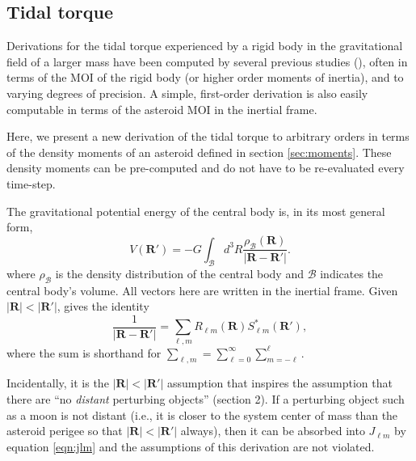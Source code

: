 \documentclass[9pt,twocolumn]{article}
\numberwithin{equation}{section}
\begin{document}
\subsection{Tidal torque}
\label{sec:tidal-torque}

Derivations for the tidal torque experienced by a rigid body in the gravitational field of a larger mass have been computed by several previous studies (\cite{paul88,HouMar2017,BOUE2009750, ashenberg07}), often in terms of the MOI of the rigid body (or higher order moments of inertia), and to varying degrees of precision. A simple, first-order derivation is also easily computable in terms of the asteroid MOI in the inertial frame.

Here, we present a new derivation of the tidal torque to arbitrary orders in terms of the density moments of an asteroid defined in section \ref{sec:moments}. These density moments can be pre-computed and do not have to be re-evaluated every time-step.

The gravitational potential energy of the central body is, in its most general form,
\begin{equation}
V(\bm R') = -G\int_\mathcal{B} d^3 R \frac{\rho_\mathcal{B}(\bm R)}{|\bm{R}-\bm{R'}|}.
\label{eqn:first-pe}
\end{equation}
where $\rho_\mathcal{B}$ is the density distribution of the central body and $\mathcal{B}$ indicates the central body's volume. All vectors here are written in the inertial frame. Given $|\bm{R}| < |\bm{R'}|$, \cite{Gelderen1998TheSO} gives the identity
\begin{equation}
  \frac{1}{|\bm R - \bm R'|} = \sum_{\ell, m} R_{\ell m}(\bm R) S_{\ell m}^*(\bm R'),
  \label{eqn:ylm-expansion}
\end{equation}
where the sum is shorthand for $\sum_{\ell, m} = \sum_{\ell = 0}^\infty \sum_{m=-\ell}^\ell$.

Incidentally, it is the $|\bm R| < |\bm R'|$ assumption that inspires the assumption that there are ``no \textit{distant} perturbing objects'' (section 2). If a perturbing object such as a moon is not distant (i.e., it is closer to the system center of mass than the asteroid perigee so that $|\bm R| < |\bm R'|$ always), then it can be absorbed into $J_{\ell m}$ by equation \ref{eqn:jlm} and the assumptions of this derivation are not violated.
\end{document}
